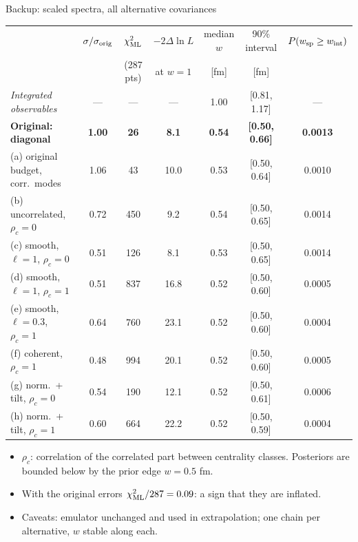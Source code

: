 \documentclass[aspectratio=169,10pt]{beamer}
\begin{document}
\begin{frame}{Backup: scaled spectra, all alternative covariances}
\centering\scriptsize
\setlength{\tabcolsep}{4pt}
\begin{tabular}{@{}lcccccc@{}}
\toprule
 & $\sigma/\sigma_{\rm orig}$ & $\chi^2_{\rm ML}$ & $-2\Delta\ln L$ & median $w$ & 90\% interval & $P(w_{\rm sp}\ge w_{\rm int})$ \\
 & & (287 pts) & at $w=1$ & [fm] & [fm] & \\
\midrule
\emph{Integrated observables} & --- & --- & --- & 1.00 & [0.81, 1.17] & --- \\
\midrule
\textbf{Original: diagonal} & \textbf{1.00} & \textbf{26} & \textbf{8.1} & \textbf{0.54} & \textbf{[0.50, 0.66]} & \textbf{0.0013} \\
\midrule
(a) original budget, corr.\ modes & 1.06 & 43 & 10.0 & 0.53 & [0.50, 0.64] & 0.0010 \\
(b) uncorrelated, $\rho_c=0$ & 0.72 & 450 & 9.2 & 0.54 & [0.50, 0.65] & 0.0014 \\
(c) smooth, $\ell=1$, $\rho_c=0$ & 0.51 & 126 & 8.1 & 0.53 & [0.50, 0.65] & 0.0014 \\
(d) smooth, $\ell=1$, $\rho_c=1$ & 0.51 & 837 & 16.8 & 0.52 & [0.50, 0.60] & 0.0005 \\
(e) smooth, $\ell=0.3$, $\rho_c=1$ & 0.64 & 760 & 23.1 & 0.52 & [0.50, 0.60] & 0.0004 \\
(f) coherent, $\rho_c=1$ & 0.48 & 994 & 20.1 & 0.52 & [0.50, 0.60] & 0.0005 \\
(g) norm.\ + tilt, $\rho_c=0$ & 0.54 & 190 & 12.1 & 0.52 & [0.50, 0.61] & 0.0006 \\
(h) norm.\ + tilt, $\rho_c=1$ & 0.60 & 664 & 22.2 & 0.52 & [0.50, 0.59] & 0.0004 \\
\bottomrule
\end{tabular}
\vspace{2mm}

\raggedright\small
\begin{itemize}
  \item $\rho_c$: correlation of the correlated part between centrality classes. Posteriors are bounded below by the prior edge $w=0.5$ fm.
  \item With the original errors $\chi^2_{\rm ML}/287=0.09$: a sign that they are inflated.
  \item Caveats: emulator unchanged and used in extrapolation; one chain per alternative, $w$ stable along each.
\end{itemize}
\end{frame}
\end{document}
